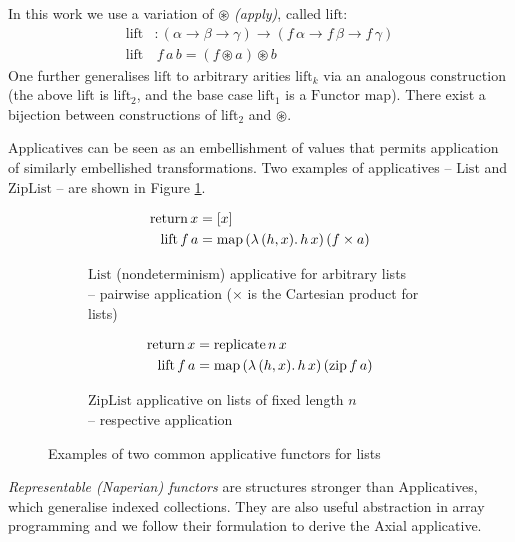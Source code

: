 In this work we use a variation of $\circledast$ \textit{(apply)}, called $\mathrm{lift}$:
\begin{align*}
\mathrm{lift}& : (\alpha \to \beta \to \gamma) \to (f\,\alpha \to f\,\beta \to f\,\gamma) \\ 
\mathrm{lift}&\,f\,a\,b = (f \circledast a) \circledast b
\end{align*}
One further generalises $\mathrm{lift}$ to arbitrary arities $\mathrm{lift}_k$ via an analogous construction (the above $\mathrm{lift}$ is $\mathrm{lift}_2$, and the base case $\mathrm{lift}_1$ is a $\mathrm{Functor}$ map). There exist a bijection between constructions of $\mathrm{lift}_2$ and $\circledast$.

Applicatives can be seen as an embellishment of values that permits application of similarly embellished transformations. Two examples of applicatives -- $\mathrm{List}$ and $\mathrm{ZipList}$ -- are shown in Figure \ref{fig:applicatives}.
%
\begin{figure}
\centering
\begin{subfigure}{.5\textwidth}
  \centering
  \begin{align*}
\mathrm{return}\,x &= [x] \\
\mathrm{lift}\,f\,a &= \mathrm{map}\,(\lambda\,(h, x) \ldotp h\,x)\,(f \times a)
  \end{align*}
  \caption{$\mathrm{List}$ (nondeterminism) applicative for arbitrary lists \\ -- pairwise application ($\times$ is the Cartesian product for lists)}
\end{subfigure}%
\begin{subfigure}{.5\textwidth}
  \centering
  \begin{align*}
\mathrm{return}\,x &= \mathrm{replicate}\,n\,x \\
\mathrm{lift}\,f\,a &= \mathrm{map}\,(\lambda\,(h, x) \ldotp h\,x)\,(\mathrm{zip}\,f\,a)
  \end{align*}
  \caption{$\mathrm{ZipList}$ applicative on lists of fixed length $n$ \\ -- respective application}
\end{subfigure}
\caption{Examples of two common applicative functors for lists}
\label{fig:applicatives}
\end{figure}

\textit{Representable (Naperian) functors} are structures stronger than Applicatives, which generalise indexed collections. They are also useful abstraction in array programming \textcite{gibbons2016aplicative} and we follow their formulation to derive the Axial applicative.

